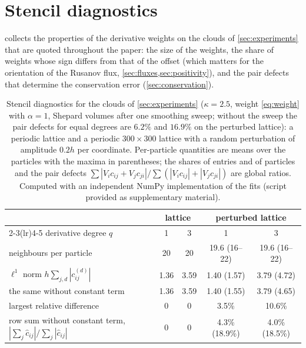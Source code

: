 \documentclass[11pt,a4paper]{article}
\numberwithin{equation}{section}
\begin{document}
\section{Stencil diagnostics}\label{app:stencils}

 collects the properties of the derivative weights on the clouds of \cref{sec:experiments} that are quoted throughout the paper: the size of the weights, the share of weights whose sign differs from that of the offset (which matters for the orientation of the Rusanov flux, \cref{sec:fluxes,sec:positivity}), and the pair defects that determine the conservation error (\cref{sec:conservation}).

\begin{table}[!htbp]
\centering
\caption{Stencil diagnostics for the clouds of \cref{sec:experiments} ($\kappa=2.5$, weight \eqref{eq:weight} with $\alpha=1$, Shepard volumes after one smoothing sweep; without the sweep the pair defects for equal degrees are $6.2\%$ and $16.9\%$ on the perturbed lattice): a periodic lattice and a periodic $300\times300$ lattice with a random perturbation of amplitude $0.2h$ per coordinate. Per-particle quantities are means over the particles with the maxima in parentheses; the shares of entries and of particles and the pair defects $\sum|V_ic_{ij}+V_jc_{ji}|/\sum(|V_ic_{ij}|+|V_jc_{ji}|)$ are global ratios. Computed with an independent NumPy implementation of the fits (script provided as supplementary material).}\label{tab:stencils}
\small
\begin{tabular}{lcccc}
\toprule
& \multicolumn{2}{c}{lattice} & \multicolumn{2}{c}{perturbed lattice}\\
\cmidrule(lr){2-3}\cmidrule(lr){4-5}
derivative degree $q$ & 1 & 3 & 1 & 3\\
\midrule
neighbours per particle & 20 & 20 & 19.6 (16--22) & 19.6 (16--22)\\
$\ell^1$ norm $h\sum_{j,d}|c^{(d)}_{ij}|$ & 1.36 & 3.59 & 1.40 (1.57) & 3.79 (4.72)\\
\quad the same without constant term & 1.36 & 3.59 & 1.40 (1.55) & 3.79 (4.65)\\
\quad largest relative difference & 0 & 0 & 3.5\% & 10.6\%\\
row sum without constant term, $|\sum_j\hat c_{ij}|/\sum_j|\hat c_{ij}|$ & 0 & 0 & 4.3\% (18.9\%) & 4.0\% (18.5\%)\\

\end{tabular}
\end{table}
\end{document}
